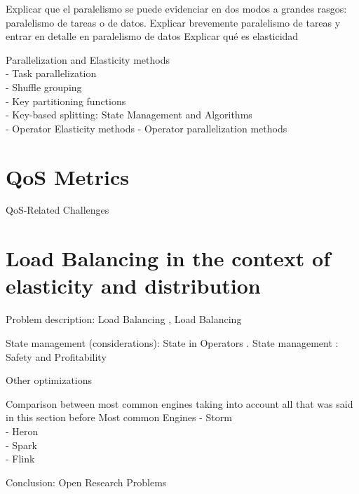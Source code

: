   Explicar que el paralelismo se puede evidenciar en dos modos a grandes rasgos: paralelismo de tareas o de datos. Explicar brevemente paralelismo de tareas y entrar en detalle en paralelismo de datos
  Explicar qué es elasticidad

  Parallelization and Elasticity methods \cite{R_ger_2019}\\
  - Task parallelization \cite{R_ger_2019}\\
  - Shuffle grouping \cite{R_ger_2019}\\
  - Key partitioning functions \cite{R_ger_2019}\\
  - Key-based splitting: State Management and Algorithms \cite{R_ger_2019}\\
  - Operator Elasticity methods \cite{R_ger_2019}
  - Operator parallelization methods \cite{R_ger_2019}


  \section{QoS Metrics}
  QoS-Related Challenges\cite{chakravarthy2009stream}
  \section{Load Balancing in the context of elasticity and distribution}

  Problem description: Load Balancing  \cite{Hirzel_2014},   Load Balancing \cite{R_ger_2019}

  State management (considerations): State in Operators \cite{R_ger_2019}. State management \cite{R_ger_2019}: Safety and Profitability \cite{Schneider_2013}\cite{R_ger_2019}

  Other optimizations

  Comparison between most common engines taking into account all that was said in this section before
  Most common Engines  \cite{kamburugamuve2013survey}
  - Storm  \cite{kamburugamuve2013survey} \cite{R_ger_2019}\\
  - Heron \cite{R_ger_2019}\\
  - Spark \cite{R_ger_2019}\\
  - Flink \cite{R_ger_2019}

  Conclusion: Open Research Problems \cite{Schneider_2013}

